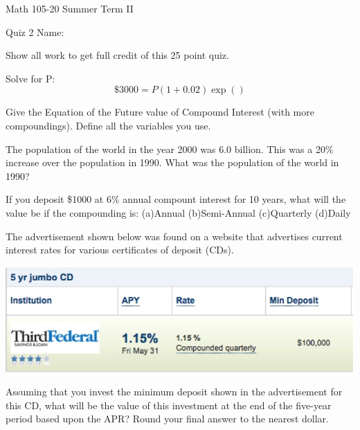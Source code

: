 \documentclass[11pt,epsfig]{article}
\begin{document}
Math 105-20 Summer Term II 

Quiz 2 \hspace{1.9in} {Name:} {\underline {\hspace{2.5in}}}
\vspace{2pc}

Show all work to get full credit of this 25 point quiz.
\vspace{2pc}

\begin{problem}{5}
Solve for P:
\begin{equation*}
\$ 3000=P(1+0.02)\exp()
\end{equation*}
\vfill
\end{problem}

\begin{problem}{6}
Give the Equation of the Future value of Compound Interest (with more compoundings). Define all the variables you use. 
\vfill
\end{problem}

\begin{problem}{3}
The population of the world in the year 2000 was 6.0 billion. This was a 20\%
increase over the population in 1990. What was the population of the world in 1990?
\vfill
\end{problem}

\newpage

\begin{problem}{5}
If you deposit \$1000 at 6\% annual compount interest for 10 years, what will the value be if the compounding is:
\newline(a)Annual
\newline(b)Semi-Annual
\newline(c)Quarterly
\newline(d)Daily
\vfill
\end{problem}

\begin{problem}{5}
The advertisement shown below was found on a website that advertises current
interest rates for various certificates of deposit (CDs).
\newline
\centerline{\includegraphics[scale=0.6]{quiz1interest.jpg}}
\newline
Assuming that you invest the minimum deposit shown in the advertisement for this CD, what will be the value of this investment at the end of the five-year period based upon the APR?
Round your final answer to the nearest dollar.
\vfill
\end{problem}

\showpoints
\end{document}
